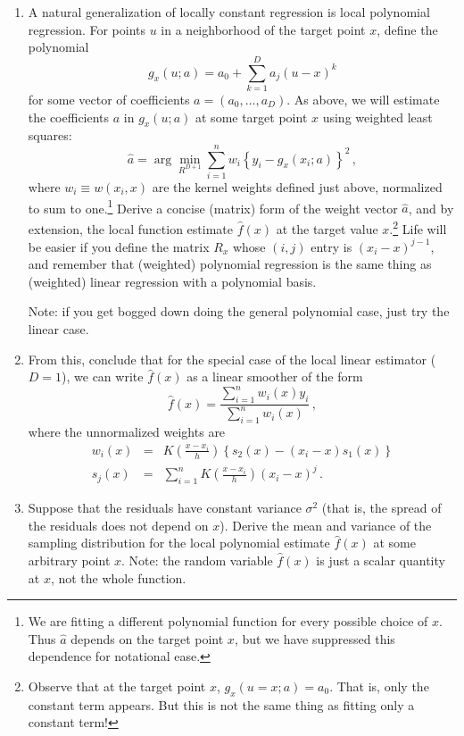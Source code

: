 \documentclass{homework}
\begin{document}
\begin{enumerate}[label=(\Alph*)]

\item  A natural generalization of locally constant regression is local polynomial regression.  For points $u$ in a neighborhood of the target point $x$, define the polynomial
$$
g_{x}(u; a) = a_0 + \sum_{k=1}^D a_j(u-x)^k 
$$
for some vector of coefficients $a = (a_0, \ldots, a_D)$.  As above, we will estimate the coefficients $a$ in $g_{x}(u; a)$ at some target point $x$ using weighted least squares:
$$
\hat{a} = \arg \min_{R^{D+1}} \sum_{i=1}^n w_i \left\{ y_i - g_{x}(x_i; a)  \right\}^2 \, ,
$$
where $w_i \equiv w(x_i, x)$ are the kernel weights defined just above, normalized to sum to one.\footnote{We are fitting a different polynomial function for every possible choice of $x$.  Thus $\hat{a}$ depends on the target point $x$, but we have suppressed this dependence for notational ease.} Derive a concise (matrix) form of the weight vector $\hat{a}$, and by extension, the local function estimate $\hat{f}(x)$ at the target value $x$.\footnote{Observe that at the target point $x$, $g_x(u = x; a) = a_0$.  That is, only the constant term appears.  But this is not the same thing as fitting only a constant term!}   Life will be easier if you define the matrix $R_x$ whose $(i,j)$ entry is $(x_i-x)^{j-1}$, and remember that (weighted) polynomial regression is the same thing as (weighted) linear regression with a polynomial basis.

Note: if you get bogged down doing the general polynomial case, just try the linear case.

\item From this, conclude that for the special case of the local linear estimator ($D=1$), we can write $\hat{f}(x)$ as a linear smoother of the form
$$
\hat{f}(x) = \frac{\sum_{i=1}^n w_i(x) y_i }{\sum_{i=1}^n w_i(x)} \, ,
$$
where the unnormalized weights are
\begin{eqnarray*}
w_i(x) &=& K \left( \frac{x-x_i}{h} \right) \left\{  s_2(x) - (x_i-x) s_1(x) \right\}\\
s_j(x) &=& \sum_{i=1}^n K \left( \frac{x-x_i}{h} \right) (x_i-x)^j \, .
\end{eqnarray*}

\item Suppose that the residuals have constant variance $\sigma^2$ (that is, the spread of the residuals does not depend on $x$).  Derive the mean and variance of the sampling distribution for the local polynomial estimate $\hat{f}(x)$ at some arbitrary point $x$.  Note: the random variable $\hat{f}(x)$ is just a scalar quantity at $x$, not the whole function.


\end{enumerate}
\end{document}
